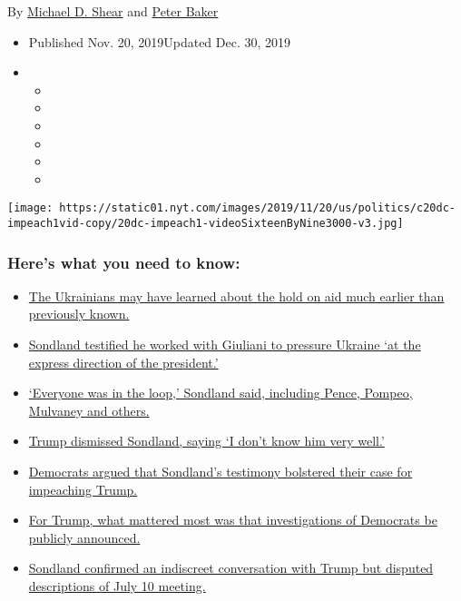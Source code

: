By \href{https://www.nytimes.com/by/michael-d-shear}{Michael D. Shear}
and \href{https://www.nytimes.com/by/peter-baker}{Peter Baker}

\begin{itemize}
\item
  Published Nov. 20, 2019Updated Dec. 30, 2019
\item
  \begin{itemize}
  \item
  \item
  \item
  \item
  \item
  \item
  \end{itemize}
\end{itemize}

\texttt{[image: https://static01.nyt.com/images/2019/11/20/us/politics/c20dc-impeach1vid-copy/20dc-impeach1-videoSixteenByNine3000-v3.jpg]}

\hypertarget{heres-what-you-need-to-know}{%
\subsubsection{Here's what you need to
know:}\label{heres-what-you-need-to-know}}

\begin{itemize}
\tightlist
\item
  \protect\hyperlink{link-137a0fab}{The Ukrainians may have learned
  about the hold on aid much earlier than previously known.}
\item
  \protect\hyperlink{link-4911ce00}{Sondland testified he worked with
  Giuliani to pressure Ukraine `at the express direction of the
  president.'}
\item
  \protect\hyperlink{link-437d93f8}{`Everyone was in the loop,' Sondland
  said, including Pence, Pompeo, Mulvaney and others.}
\item
  \protect\hyperlink{link-5226be42}{Trump dismissed Sondland, saying `I
  don't know him very well.'}
\item
  \protect\hyperlink{link-555ff837}{Democrats argued that Sondland's
  testimony bolstered their case for impeaching Trump.}
\item
  \protect\hyperlink{link-7937b34e}{For Trump, what mattered most was
  that investigations of Democrats be publicly announced.}
\item
  \protect\hyperlink{link-4eb48fee}{Sondland confirmed an indiscreet
  conversation with Trump but disputed descriptions of July 10 meeting.}
\end{itemize}

